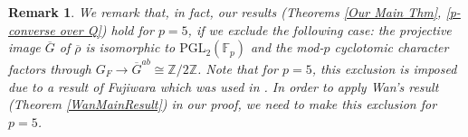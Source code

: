 \documentclass[reqno,10pt]{amsart}
\newcommand{\z}{\mathbb{Z}}
\newcommand{\Varpi}{\rotatebox[origin=c]{180}{$\Pi\kern-0.361em\Pi$}}
\theoremstyle{plain}
\newtheorem{rem}[thm]{Remark}
\theoremstyle{definition}
\begin{document}
        
\begin{rem}
  We remark that, in fact, our results (Theorems \ref{Our Main Thm}, \ref{p-converse over Q}) hold for $p = 5$, if we exclude the following case: the projective image $\overline{G}$ of $\overline{\rho}$ is isomorphic to $\mathrm{PGL}_2(\mathbb{F}_p)$ and the mod-$p$ cyclotomic character factors through $G_F \rightarrow \overline{G}^{ab} \cong \z/{2\z}$. Note that for $p=5$, this exclusion is imposed due to a result of Fujiwara \cite[Theorem 8]{Wan} which was used in \cite{Wan}. In order to apply Wan's result (Theorem \ref{WanMainResult}) in our proof, we need to make this exclusion for $p=5$.
\end{rem}
\end{document}
